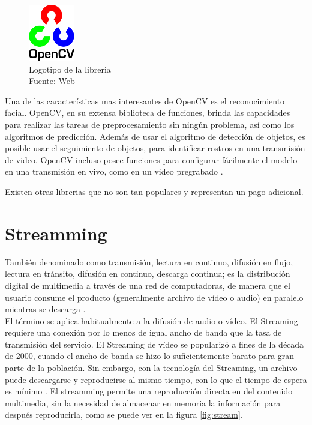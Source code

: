 \begin{figure}[H]
    \begin{center}
        \includegraphics[width=2cm]{img/capitulo_2/cv2_logo.png}
    \end{center}
    \caption{Logotipo de la libreria\\Fuente: Web}
    \label{fig:cv2_logo}
\end{figure}

Una de las características mas interesantes de OpenCV es el reconocimiento facial. OpenCV, en su extensa biblioteca de funciones, brinda las capacidades para realizar las tareas de preprocesamiento sin ningún problema, así como los algoritmos de predicción. Además de usar el algoritmo de detección de objetos, es posible usar el seguimiento de objetos, para identificar rostros en una transmisión de video. OpenCV incluso posee funciones para configurar fácilmente el modelo en una transmisión en vivo, como en un video pregrabado \cite{medium:opencv}. 

Existen otras librerias que no son tan populares y representan un pago adicional.

\section{Streamming}
También denominado como transmisión, lectura en continuo, difusión en flujo, lectura en tránsito, difusión en continuo, descarga continua; es la distribución digital de multimedia a través de una red de computadoras, de manera que el usuario consume el producto (generalmente archivo de vídeo o audio) en paralelo mientras se descarga \cite{streamming:austerberry}.\\

El término se aplica habitualmente a la difusión de audio o vídeo. El Streaming requiere una conexión por lo menos de igual ancho de banda que la tasa de transmisión del servicio. El Streaming de vídeo se popularizó a fines de la década de 2000, cuando el ancho de banda se hizo lo suficientemente barato para gran parte de la población. Sin embargo, con la tecnología del Streaming, un archivo puede descargarse y reproducirse al mismo tiempo, con lo que el tiempo de espera es mínimo \cite{streamming:austerberry}. El streamming permite una reproducción directa en del contenido multimedia, sin la necesidad de almacenar en memoria la información para después reproducirla, como se puede ver en la figura \ref{fig:stream}.\\

